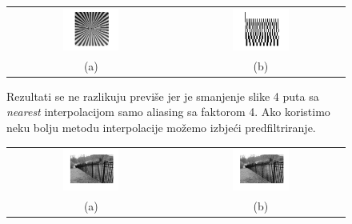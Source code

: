 \documentclass[12pt, a4]{report}
\begin{document}
\begin{enumerate}
\begin{figure}
\begin{tabular}{cc}
                        \includegraphics[width=0.35\textwidth]{testpat1small} & \includegraphics[width=0.35\textwidth]{uzoraksmall}\\
                        (a) & (b)
                    \end{tabular}
                    \caption{Rezultati se ne razlikuju previše jer je smanjenje slike 4 puta sa {\it nearest} interpolacijom samo aliasing sa faktorom 4. Ako koristimo neku bolju metodu interpolacije možemo izbjeći predfiltriranje.}    
                    \label{fig:sampling6}
                \end{figure}
                \begin{figure}
                    \centering
                    \begin{tabular}{cc}
                        \includegraphics[width=0.35\textwidth]{fence} & \includegraphics[width=0.35\textwidth]{fenceAlias}\\
                        (a) & (b)
                    \end{tabular}

\end{figure}
\end{enumerate}
\end{document}
